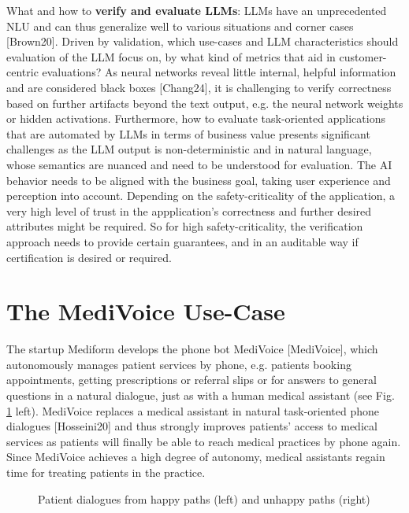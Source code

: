 \documentclass[twocolumn]{article}
\begin{document}
\begin{compactenum}
\item What and how to {\bfseries verify and evaluate LLMs}: LLMs have an unprecedented NLU and can thus generalize well to various situations and corner cases [Brown20]. Driven by validation, which use-cases and LLM characteristics should evaluation of the LLM focus on, by what kind of metrics that aid in customer-centric evaluations? As neural networks reveal little internal, helpful information and are considered black boxes [Chang24], it is challenging to verify correctness based on further artifacts beyond the text output, e.g. the neural network weights or hidden activations. Furthermore, how to evaluate task-oriented applications that are automated by LLMs in terms of business value presents significant challenges as the LLM output is non-deterministic and in natural language, whose semantics are nuanced and need to be understood for evaluation. The AI behavior needs to be aligned with the business goal, taking user experience and perception into account. Depending on the safety-criticality of the application, a very high level of trust in the appplication's correctness and further desired attributes might be required. So for high safety-criticality, the verification approach needs to provide certain guarantees, and in an auditable way if certification is desired or required.
\end{compactenum}

\section{The MediVoice Use-Case}
The startup Mediform develops the phone bot MediVoice [MediVoice], which autonomously manages patient services by phone, e.g. patients booking appointments, getting prescriptions or referral slips or for answers to general questions in a natural dialogue, just as with a human medical assistant (see Fig. \ref{fig:dialogues} left). MediVoice replaces a medical assistant in natural task-oriented phone dialogues  [Hosseini20] and thus strongly improves patients’ access to medical services as patients will finally be able to reach medical practices by phone again.
Since MediVoice achieves a high degree of autonomy, medical assistants regain time for treating patients in the practice. 

\begin{figure}[hbt!]
\begin{center}
\caption{Patient dialogues from happy paths (left) and unhappy paths (right)}
\label{fig:dialogues}
\end{center}
\end{figure}
\end{document}
